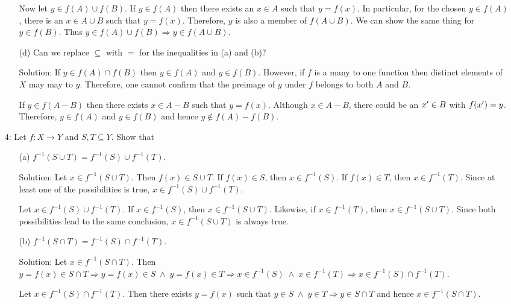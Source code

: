 \begin{enumerate}
\begin{enumerate}
Now let $y \in f(A) \cup f(B)$. If $y \in f(A)$ then there exists an $x
\in A$ such that $y = f(x)$. In particular, for the chosen $y \in f(A)$,
there is an $x \in A \cup B$ such that $y = f(x)$. Therefore, $y$ is also
a member of $f(A \cup B)$. We can show the same thing for $y \in f(B)$.
Thus $y \in f(A) \cup f(B) \Rightarrow y \in f(A \cup B)$.

\item[(d)] Can we replace $\subseteq$ with $=$ for the inequalities in
(a) and (b)?
\item[Solution:] If $y \in f(A) \cap f(B)$ then $y \in f(A)$ and $y \in 
f(B)$. However, if $f$ is a many to one function then distinct elements of 
$X$ may may to $y$. Therefore, one cannot confirm that the preimage of $y$
under $f$ belongs to both $A$ and $B$.

If $y \in f(A - B)$ then there exists $x \in A - B$ such that $y = f(x)$.
Although $x \in A - B$, there could be an $x^\prime \in B$ with $f(x^\prime) = y$.
Therefore, $y \in f(A)$ and $y \in f(B)$ and hence $y \notin f(A) - f(B)$.
\end{enumerate}

\item[4:] Let $f: X \rightarrow Y$ and $S, T \subseteq Y$. Show that
\begin{enumerate}
\item[(a)] $f^{-1}(S \cup T) = f^{-1}(S) \cup f^{-1}(T)$.
\item[Solution:] Let $x \in f^{-1}(S \cup T)$. Then $f(x) \in S \cup T$.
If $f(x) \in S$, then $x \in f^{-1}(S)$. If $f(x) \in T$, then $x \in 
f^{-1}(T)$. Since at least one of the possibilities is true, $x \in f^{-1}
(S) \cup f^{-1}(T)$.

Let $x \in f^{-1}(S) \cup f^{-1}(T)$. If $x \in f^{-1}(S)$, then $x \in
f^{-1}(S \cup T)$. Likewise, if $x \in f^{-1}(T)$, then $x \in f^{-1}(S
\cup T)$. Since both possibilities lead to the same conclusion, $x \in
f^{-1}(S \cup T)$ is always true.

\item[(b)] $f^{-1}(S \cap T) = f^{-1}(S) \cap f^{-1}(T)$.
\item[Solution:] Let $x \in f^{-1}(S \cap T)$. Then $y = f(x) \in S \cap T
\Rightarrow y = f(x) \in S \;\land\; y = f(x) \in T \Rightarrow x \in
f^{-1}(S) \;\land\; x \in f^{-1}(T) \Rightarrow x \in f^{-1}(S) \cap
f^{-1}(T)$.

Let $x \in f^{-1}(S) \cap f^{-1}(T)$. Then there exists $y = f(x)$ such 
that $y \in S \;\land\; y \in T \Rightarrow y \in S \cap T$ and hence $x
\in f^{-1}(S \cap T)$.


\end{enumerate}
\end{enumerate}
